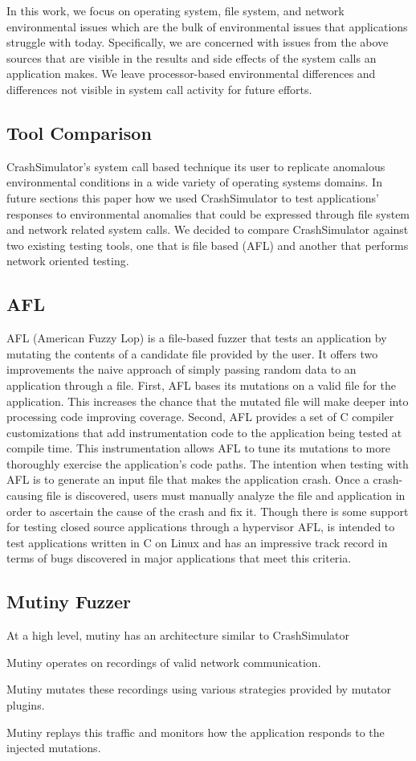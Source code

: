 In this work, we focus on operating system, file system, and network
environmental issues which are the bulk of environmental issues that
applications struggle with today. Specifically, we are concerned with
issues from the above sources that are visible in the results and side
effects of the system calls an application makes.  We leave processor-based
environmental differences and differences not visible in system call
activity for future efforts.

\subsection{Tool Comparison}

CrashSimulator's system call based technique its user to replicate
anomalous environmental conditions in a wide variety of operating systems
domains.  In future sections this paper how we used CrashSimulator to test
applications' responses to environmental anomalies that could be expressed
through file system and network related system calls.  We decided to
compare CrashSimulator against two existing testing tools, one that is file
based (AFL) and another that performs network oriented testing.

\subsection{AFL}

AFL (American Fuzzy Lop) is a file-based fuzzer that tests an application
by mutating the contents of a candidate file provided by the user.  It
offers two improvements the naive approach of simply passing random data to
an application through a file.  First, AFL bases its mutations on a valid
file for the application.  This increases the chance that the mutated file
will make deeper into processing code improving coverage.  Second, AFL
provides a set of C compiler customizations that add instrumentation code
to the application being tested at compile time.  This instrumentation
allows AFL to tune its mutations to more thoroughly exercise the
application's code paths.  The intention when testing with AFL is to
generate an input file that makes the application crash.  Once a
crash-causing file is discovered, users must manually analyze the file and
application in order to ascertain the cause of the crash and fix it.
Though there is some support for testing closed source applications through
a hypervisor AFL, is intended to test applications written in C on Linux
and has an impressive track record in terms of bugs discovered in major
applications that meet this criteria.


\subsection{Mutiny Fuzzer}

At a high level, mutiny has an architecture similar to CrashSimulator

Mutiny operates on recordings of valid network communication.

Mutiny mutates these recordings using various strategies provided by
mutator plugins.

Mutiny replays this traffic and monitors how the application responds to
the injected mutations.

